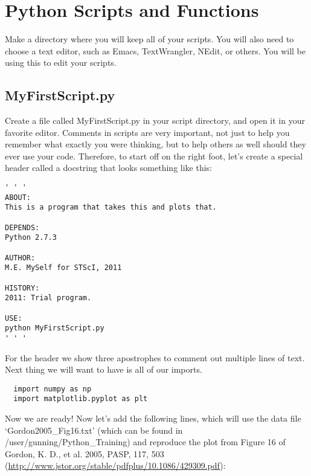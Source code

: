 \chapter{Python Scripts and Functions}
\label{ch:scripts}

Make a directory where you will keep all of your scripts.  You will
also need to choose a text editor, such as Emacs, TextWrangler, NEdit,
or others.  You will be using this to edit your scripts.
 
\section{MyFirstScript.py}

Create a file called MyFirstScript.py in your script directory, and
open it in your favorite editor.  Comments in scripts are very
important, not just to help you remember what exactly you were
thinking, but to help others as well should they ever use your code.
Therefore, to start off on the right foot, let's create a special header 
called a docstring that looks something like this:

\begin{verbatim}
' ' '
ABOUT:
This is a program that takes this and plots that.

DEPENDS:
Python 2.7.3

AUTHOR:
M.E. MySelf for STScI, 2011

HISTORY:
2011: Trial program.

USE:
python MyFirstScript.py
' ' '
\end{verbatim}

For the header we show three apostrophes to comment out multiple lines
of text.  Next thing we will want to have is all of our imports.

\begin{verbatim}
  import numpy as np
  import matplotlib.pyplot as plt 
\end{verbatim}

Now we are ready!  Now let's add the following lines, which will use the
data file `Gordon2005\_Fig16.txt' (which can be found in 
/user/gunning/Python\_Training) and reproduce the plot from Figure 16 of
Gordon, K. D., et al. 2005, PASP, 117, 503 
(\url {http://www.jstor.org/stable/pdfplus/10.1086/429309.pdf}):

